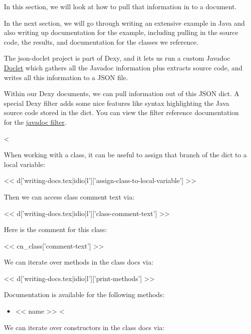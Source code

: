 In this section, we will look at how to pull that information in to a document.

In the next section, we will go through writing an extensive example in Java
and also writing up documentation for the example, including pulling in the
source code, the results, and documentation for the classes we reference.

The json-doclet project is part of Dexy, and it lets us run a custom Javadoc
\href{http://download.oracle.com/javase/6/docs/technotes/guides/javadoc/doclet/overview.html}{Doclet}
which gathers all the Javadoc information plus extracts source code, and
writes all this information to a JSON file.

Within our Dexy documents, we can pull information out of this JSON dict. A
special Dexy filter adds some nice features like syntax highlighting the Java
source code stored in the dict. You can view the filter reference documentation
for the \href{http://dexy.it/docs/filters/javadoc}{javadoc filter}.

<%

When working with a class, it can be useful to assign that branch of the dict to a local variable:

<< d['writing-docs.tex|idio|l']['assign-class-to-local-variable'] >>

Then we can access class comment text via:

<< d['writing-docs.tex|idio|l']['class-comment-text'] >>

Here is the comment for this class:

<< cn_class['comment-text'] >>

We can iterate over methods in the class docs via:

<< d['writing-docs.tex|idio|l']['print-methods'] >>

Documentation is available for the following methods:

\begin{itemize}
<%
\item{<< name >>}
<%
\end{itemize}

We can iterate over constructors in the class docs via:

